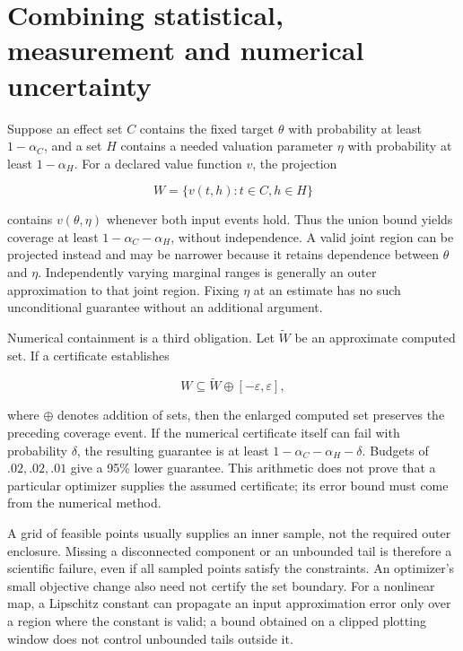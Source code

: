 \hypertarget{combining-statistical-measurement-and-numerical-uncertainty}{%
\section{Combining statistical, measurement and numerical
uncertainty}\label{combining-statistical-measurement-and-numerical-uncertainty}}

Suppose an effect set \(C\) contains the fixed target \(\theta\) with
probability at least \(1-\alpha_C\), and a set \(H\) contains a needed
valuation parameter \(\eta\) with probability at least \(1-\alpha_H\).
For a declared value function \(v\), the projection

\[
 W=\{v(t,h):t\in C,h\in H\}
\]

contains \(v(\theta,\eta)\) whenever both input events hold. Thus the
union bound yields coverage at least \(1-\alpha_C-\alpha_H\), without
independence. A valid joint region can be projected instead and may be
narrower because it retains dependence between \(\theta\) and \(\eta\).
Independently varying marginal ranges is generally an outer
approximation to that joint region. Fixing \(\eta\) at an estimate has
no such unconditional guarantee without an additional argument.

Numerical containment is a third obligation. Let \(\widetilde W\) be an
approximate computed set. If a certificate establishes

\[
 W\subseteq\widetilde W\oplus[-\varepsilon,\varepsilon],
\]

where \(\oplus\) denotes addition of sets, then the enlarged computed
set preserves the preceding coverage event. If the numerical certificate
itself can fail with probability \(\delta\), the resulting guarantee is
at least \(1-\alpha_C-\alpha_H-\delta\). Budgets of \(.02,.02,.01\) give
a 95\% lower guarantee. This arithmetic does not prove that a particular
optimizer supplies the assumed certificate; its error bound must come
from the numerical method. \citep{exec13_interchange_examples}

A grid of feasible points usually supplies an inner sample, not the
required outer enclosure. Missing a disconnected component or an
unbounded tail is therefore a scientific failure, even if all sampled
points satisfy the constraints. An optimizer's small objective change
also need not certify the set boundary. For a nonlinear map, a Lipschitz
constant can propagate an input approximation error only over a region
where the constant is valid; a bound obtained on a clipped plotting
window does not control unbounded tails outside it.

